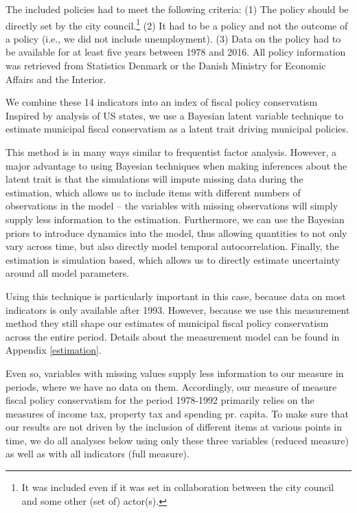 \documentclass[a4paper,12pt]{article}
\begin{document}
The included policies had to meet the following criteria: (1) The policy should be directly set by the city council.\footnote{It was included even if it was set in collaboration between the city council and some other (set of) actor(s).} (2) It had to be a policy and not the outcome of a policy (i.e., we did not include unemployment). (3) Data on the policy had to be available for at least five years between 1978 and 2016. All policy information was retrieved from Statistics Denmark or the Danish Ministry for Economic Affairs and the Interior.

We combine these 14 indicators into an index of fiscal policy conservatism Inspired by \cite{caughey2016dynamics} analysis of US states, we use a Bayesian latent variable technique to estimate municipal fiscal conservatism as a latent trait driving municipal policies. 

This method is in many ways similar to frequentist factor analysis. However, a major advantage to using Bayesian techniques when making inferences about the latent trait is that the simulations will impute missing data during the estimation, which allows us to include items with different numbers of observations in the model -- the variables with missing observations will simply supply less information to the estimation. Furthermore, we can use the Bayesian priors to introduce dynamics into the model, thus allowing quantities to not only vary across time, but also directly model temporal autocorrelation. Finally, the estimation is simulation based, which allows us to directly estimate uncertainty around all model parameters.

Using this technique is particularly important in this case, because data on most indicators is only available after 1993. However, because we use this measurement method they still shape our estimates of municipal fiscal policy conservatism across the entire period. Details about the measurement model can be found in Appendix \ref{estimation}. 

Even so, variables with missing values supply less information to our measure in periods, where we have no data on them. Accordingly, our measure of measure fiscal policy conservatism for the period 1978-1992 primarily relies on the measures of income tax, property tax and spending pr. capita. To make sure that our results are not driven by the inclusion of different items at various points in time, we do all analyses below using only these three variables (reduced measure) as well as with all indicators (full measure).
\end{document}
